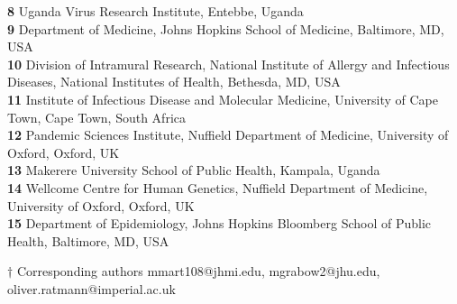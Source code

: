 \documentclass[10pt,letterpaper]{article}
\begin{document}
\begin{flushleft}
\textbf{8} Uganda Virus Research Institute, Entebbe, Uganda \\

\textbf{9} Department of Medicine, Johns Hopkins School of Medicine, Baltimore, MD, USA
\\
\textbf{10} Division of Intramural Research, National Institute of Allergy and Infectious Diseases, National Institutes of Health, Bethesda, MD, USA
\\
\textbf{11} Institute of Infectious Disease and Molecular Medicine, University of Cape Town, Cape Town, South Africa
\\
\textbf{12} Pandemic Sciences Institute, Nuffield Department of Medicine, University of Oxford, Oxford, UK \\

\textbf{13} Makerere University School of Public Health, Kampala, Uganda \\

\textbf{14} Wellcome Centre for Human Genetics, Nuffield Department of Medicine, University of Oxford, Oxford, UK \\

\textbf{15} Department of Epidemiology, Johns Hopkins Bloomberg School of Public Health, Baltimore, MD, USA \\

\bigskip

$\dagger$ Corresponding authors mmart108@jhmi.edu, mgrabow2@jhu.edu, oliver.ratmann@imperial.ac.uk 
\end{flushleft}

\end{document}
